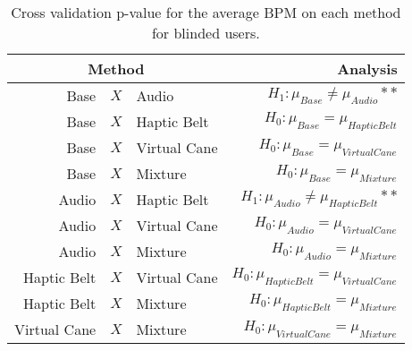 
\begin{table}[!htb]
\centering
\caption{Cross validation p-value for the average BPM on each method for blinded users.}
\label{tab:lsd_average_bpm}
\begin{tabular}{rclr}
\toprule
      \multicolumn{3}{c}{Method} &                                       Analysis \\
\midrule
              Base & $X$ & Audio &           $H_1 : \mu_{Base} \ne \mu_{Audio}**$ \\
        Base & $X$ & Haptic Belt &         $H_0 : \mu_{Base} = \mu_{Haptic Belt}$ \\
       Base & $X$ & Virtual Cane &        $H_0 : \mu_{Base} = \mu_{Virtual Cane}$ \\
            Base & $X$ & Mixture &             $H_0 : \mu_{Base} = \mu_{Mixture}$ \\
       Audio & $X$ & Haptic Belt &    $H_1 : \mu_{Audio} \ne \mu_{Haptic Belt}**$ \\
      Audio & $X$ & Virtual Cane &       $H_0 : \mu_{Audio} = \mu_{Virtual Cane}$ \\
           Audio & $X$ & Mixture &            $H_0 : \mu_{Audio} = \mu_{Mixture}$ \\
Haptic Belt & $X$ & Virtual Cane & $H_0 : \mu_{Haptic Belt} = \mu_{Virtual Cane}$ \\
     Haptic Belt & $X$ & Mixture &      $H_0 : \mu_{Haptic Belt} = \mu_{Mixture}$ \\
    Virtual Cane & $X$ & Mixture &     $H_0 : \mu_{Virtual Cane} = \mu_{Mixture}$ \\
\bottomrule
\end{tabular}
\end{table}

